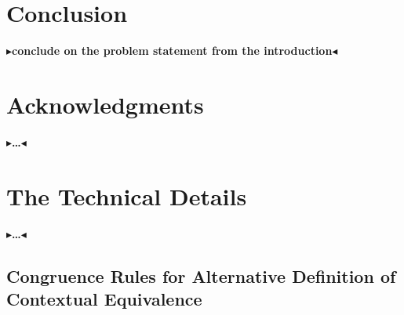\documentclass[twoside,11pt,openright]{report}
\theoremstyle{definition}
\newcommand{\todo}[1]{{\color[rgb]{.5,0,0}\textbf{$\blacktriangleright$#1$\blacktriangleleft$}}}
\begin{document}

\chapter{Conclusion}
\label{ch:conclusion}

\todo{conclude on the problem statement from the introduction}

\chapter*{Acknowledgments}

\todo{\dots}


\cleardoublepage
{}
 



\cleardoublepage
\appendix
\chapter{The Technical Details}

\todo{\dots}

\section{Congruence Rules for Alternative Definition of Contextual Equivalence}\label{appendix:Cng}
\end{document}
